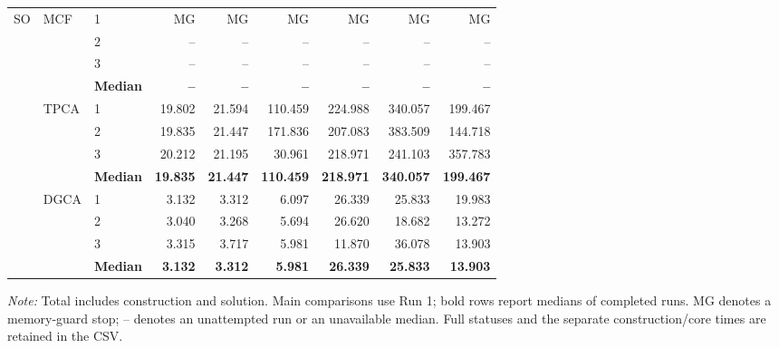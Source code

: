 \begin{table}[!t]
\begin{tabular*}{\textwidth}{@{\extracolsep{\fill}}lllrrrrrr@{}}
\multirow{12}{*}{SO} & \multirow{4}{*}{MCF} & 1 & MG & MG & MG & MG & MG & MG \\
 &  & 2 & -- & -- & -- & -- & -- & -- \\
 &  & 3 & -- & -- & -- & -- & -- & -- \\
 &  & \textbf{Median} & \textbf{--} & \textbf{--} & \textbf{--} & \textbf{--} & \textbf{--} & \textbf{--} \\
\addlinespace[1pt]
 & \multirow{4}{*}{TPCA} & 1 & 19.802 & 21.594 & 110.459 & 224.988 & 340.057 & 199.467 \\
 &  & 2 & 19.835 & 21.447 & 171.836 & 207.083 & 383.509 & 144.718 \\
 &  & 3 & 20.212 & 21.195 & 30.961 & 218.971 & 241.103 & 357.783 \\
 &  & \textbf{Median} & \textbf{19.835} & \textbf{21.447} & \textbf{110.459} & \textbf{218.971} & \textbf{340.057} & \textbf{199.467} \\
\addlinespace[1pt]
 & \multirow{4}{*}{DGCA} & 1 & 3.132 & 3.312 & 6.097 & 26.339 & 25.833 & 19.983 \\
 &  & 2 & 3.040 & 3.268 & 5.694 & 26.620 & 18.682 & 13.272 \\
 &  & 3 & 3.315 & 3.717 & 5.981 & 11.870 & 36.078 & 13.903 \\
 &  & \textbf{Median} & \textbf{3.132} & \textbf{3.312} & \textbf{5.981} & \textbf{26.339} & \textbf{25.833} & \textbf{13.903} \\
\bottomrule
\end{tabular*}
\par\smallskip
\begin{minipage}{.98\textwidth}\footnotesize
\textit{Note:} Total includes construction and solution. Main comparisons use Run 1; bold rows report medians of completed runs. MG denotes a memory-guard stop; -- denotes an unattempted run or an unavailable median. Full statuses and the separate construction/core times are retained in the CSV.
\end{minipage}
\end{table}
